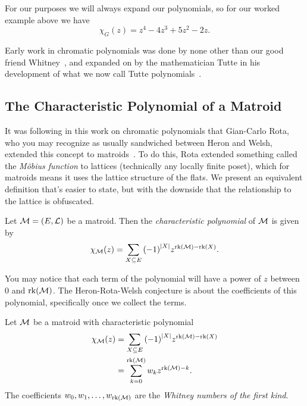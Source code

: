\documentclass[12pt,oneside]{../../sfsuthesis}
\begin{document}
For our purposes we will always expand our polynomials, so for our worked example above we have
\[
    \chi_G(z) = z^4 - 4z^3 + 5z^2 - 2z.
\]

Early work in chromatic polynomials was done by none other than our good friend Whitney~\cite{whitneyColoringGraphs1932}, and expanded on by the mathematician Tutte in his development of what we now call Tutte polynomials~\cite{tutteContributionTheoryChromatic1954}.

\subsection{The Characteristic Polynomial of a Matroid}

It was following in this work on chromatic polynomials that Gian-Carlo Rota, who you may recognize as usually sandwiched between Heron and Welsh, extended this concept to matroids~\cite{rotaFoundationsCombinatorialTheory1964}.
To do this, Rota extended something called the \emph{M\"obius function} to lattices (technically any locally finite poset), which for matroids means it uses the lattice structure of the flats.
We present an equivalent definition that's easier to state, but with the downside that the relationship to the lattice is obfuscated.

\begin{definition}\th\label{def:characteristicPoly}

    Let \( \mathcal{M} = (E, \mathcal{L}) \) be a matroid.
    Then the \emph{characteristic polynomial} of \( \mathcal{M} \) is given by
    \[
        \chi_{\mathcal{M}}(z) = \sum_{X \subseteq E} {(-1)}^{|X|}z^{\operatorname{rk}(\mathcal{M}) - \operatorname{rk}(X)}.
    \]
\end{definition}

You may notice that each term of the polynomial will have a power of \( z \) between 0 and \( \operatorname{rk}(\mathcal{M}) \).
The Heron-Rota-Welsh conjecture is about the coefficients of this polynomial, specifically once we collect the terms.

\begin{definition}\label{def:whitneyNumber}
    Let \( \mathcal{M} \) be a matroid with characteristic polynomial
    \begin{align*}
        \chi_{\mathcal{M}}(z) & = \sum_{X \subseteq E} {(-1)}^{|X|}z^{\operatorname{rk}(\mathcal{M}) - \operatorname{rk}(X)} \\
                    & = \sum_{k=0}^{\operatorname{rk}(\mathcal{M})} w_k z^{\operatorname{rk}(\mathcal{M}) - k}.
    \end{align*}
    The coefficients \( w_0, w_1, \dots, w_{\operatorname{rk}(\mathcal{M})} \) are the \emph{Whitney numbers of the first kind}.

\end{definition}
\end{document}
